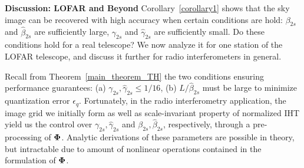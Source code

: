 \documentclass{article}
\begin{document}
{\bf Discussion: LOFAR and Beyond}
Corollary~\ref{corollary1} shows that the sky image 
can be recovered with high accuracy when certain conditions are hold:
${\beta}_{2s}$ and $\hat{\beta}_{2s}$ are sufficiently large, ${\gamma}_{2s}$ and $\hat{\gamma}_{2s}$
are sufficiently small. Do these conditions hold for a real telescope? We now analyze it for one station of the LOFAR telescope, and discuss it further for radio interferometers in general.

\vspace{-.1em}
 Recall from Theorem~\ref{main_theorem_TH} the two conditions ensuring  performance guarantees: (a) $\gamma_{2s}, \hat{\gamma}_{2s} \leq 1/16$, (b) ${L}/{\hat{\beta}_{2s}}$ must be large to minimize quantization error $ {\epsilon}_q$. Fortunately, in the radio interferometry application, the image grid we initially form as well as scale-invariant property of normalized IHT yield us the control over $\gamma_{2s}, \hat{\gamma}_{2s}$ and ${\beta}_{2s}, \hat{\beta}_{2s}$, respectively, through a pre-processing of ${\bf \Phi}$. Analytic derivations of these parameters are possible in theory, but intractable due to amount of nonlinear operations contained in the formulation of ${\bf \Phi}$. 
\end{document}
